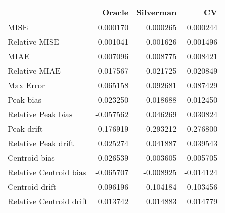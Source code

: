 \begin{tabular}{lrrr}
  \hline
 & Oracle & Silverman & CV \\ 
  \hline
MISE & 0.000170 & 0.000265 & 0.000244 \\ 
  Relative MISE & 0.001041 & 0.001626 & 0.001496 \\ 
  MIAE & 0.007096 & 0.008775 & 0.008421 \\ 
  Relative MIAE & 0.017567 & 0.021725 & 0.020849 \\ 
  Max Error & 0.065158 & 0.092681 & 0.087429 \\ 
  Peak bias & -0.023250 & 0.018688 & 0.012450 \\ 
  Relative Peak bias & -0.057562 & 0.046269 & 0.030824 \\ 
  Peak drift & 0.176919 & 0.293212 & 0.276800 \\ 
  Relative Peak drift & 0.025274 & 0.041887 & 0.039543 \\ 
  Centroid bias & -0.026539 & -0.003605 & -0.005705 \\ 
  Relative Centroid bias & -0.065707 & -0.008925 & -0.014124 \\ 
  Centroid drift & 0.096196 & 0.104184 & 0.103456 \\ 
  Relative Centroid drift & 0.013742 & 0.014883 & 0.014779 \\ 
   \hline
\end{tabular}
